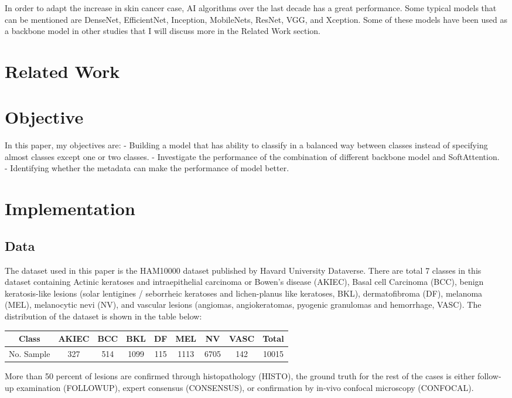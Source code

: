 In order to adapt the increase in skin cancer case, AI algorithms over the last decade has a great performance. Some typical models that can be mentioned are DenseNet\cite{06993}, EfficientNet\cite{11946}, Inception\cite{00567}, MobileNets\cite{04861}\cite{04381}\cite{02244}, ResNet\cite{03385}\cite{05027}, VGG\cite{1556}, and Xception\cite{02357}. Some of these models have been used as a backbone model in other studies that I will discuss more in the Related Work section. 

\section{Related Work}

\section{Objective}
In this paper, my objectives are: \newline
- Building a model that has ability to classify in a balanced way between classes instead of specifying almost classes except one or two classes. \newline
- Investigate the performance of the combination of different backbone model and SoftAttention. \\
- Identifying whether the metadata can make the performance of model better. \\

\section{Implementation}

\subsection{Data}
The dataset used in this paper is the HAM10000 dataset published by Havard University Dataverse\cite{10417}. There are total 7 classes in this dataset containing Actinic keratoses and intraepithelial carcinoma or Bowen's disease (AKIEC), Basal cell Carcinoma (BCC),  benign keratosis-like lesions (solar lentigines / seborrheic keratoses and lichen-planus like keratoses, BKL), dermatofibroma (DF), melanoma (MEL), melanocytic nevi (NV), and vascular lesions (angiomas, angiokeratomas, pyogenic granulomas and hemorrhage, VASC). The distribution of the dataset is shown in the table below:
\begin{center}
	\begin{tabular}{|c c c c c c c c c|} 
		\hline
		Class & AKIEC & BCC & BKL & DF & MEL & NV & VASC & Total \\ 
		\hline
		No. Sample & 327 & 514 & 1099 & 115 & 1113 & 6705 & 142 & 10015 \\
		\hline
	\end{tabular}
\end{center}
More than 50 percent of lesions are confirmed through histopathology (HISTO), the ground truth for the rest of the cases is either follow-up examination (FOLLOWUP), expert consensus (CONSENSUS), or confirmation by in-vivo confocal microscopy (CONFOCAL).
